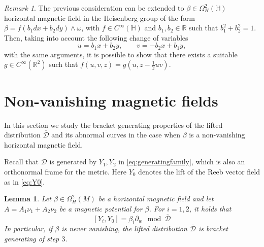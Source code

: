 \documentclass{amsart}
\theoremstyle{plain}
\newtheorem{lemma}[theorem]{Lemma}
\theoremstyle{definition}
\theoremstyle{remark}
\newtheorem{remark}[thm]{Remark}
\newcommand{\R}{\mathbb{R}}
\newcommand{\p}{\partial}												%
\newcommand{\distr}{\mathcal{D}}								%
\newcommand{\B}{\beta}
\newcommand{\lift}[1]{\overline{#1}} 							%
\begin{document}
\begin{remark}
The previous consideration can be extended to $\B\in \Omega^2_H(\mathbb{H})$ horizontal magnetic field in the Heisenberg group of the form $\B=f(b_1dx+b_2dy)\wedge\omega$, with $f\in C^\infty(\mathbb{H})$ and $b_1,b_2\in\R$ such that $b_1^2+b_2^2=1$.
Then, taking into account the following change of variables
\begin{equation}
u=b_1x+b_2y,\qquad v=-b_2x+b_1y,
\end{equation}
with the same arguments, it is possible to show that there exists a suitable $g\in  C^\infty(\R^2)$ such that $f(u,v,z)= g\left(u,z-\frac{1}{2}uv\right)$.
\end{remark}


\section{Non-vanishing magnetic fields}
\label{s:nonzeromf}

In this section we study the bracket generating properties of the lifted distribution $\lift\distr$ and its abnormal curves in the case when $\beta$ is a non-vanishing horizontal magnetic field.



Recall that $\lift\distr$ is generated by $Y_1,Y_2$ in \eqref{eq:generatingfamily}, which is also an orthonormal frame for the metric. Here
$Y_0$ denotes the lift of the Reeb vector field as in  \eqref{eq:Y0}.

\begin{lemma}
\label{lem:step3}
Let $\B\in \Omega^2_H(M)$ be a horizontal magnetic field and let $A=A_1\nu_1+A_2\nu_2$ be a magnetic potential for $\B$.
For $i=1,2$, it holds that
 \begin{equation}
 \label{eq:[Yi,Y0]}
  [Y_i,Y_0]=\B_i\p_w \mod \lift \distr
 \end{equation}
In particular, if $\B$ is never vanishing,  the lifted distribution $\lift \distr$ is bracket generating  of step $3$. 
\end{lemma}
\end{document}
